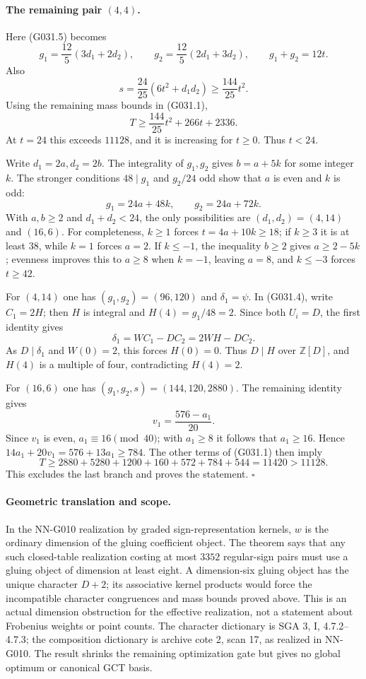 \paragraph{The remaining pair $(4,4)$.}
Here (G031.5) becomes
\[
 g_1=\frac{12}{5}(3d_1+2d_2),\qquad
 g_2=\frac{12}{5}(2d_1+3d_2),\qquad
 g_1+g_2=12t.
\]
Also
\[
 s=\frac{24}{25}(6t^2+d_1d_2)\ge\frac{144}{25}t^2.
\]
Using the remaining mass bounds in (G031.1),
\[
 T\ge\frac{144}{25}t^2+266t+2336.                  \tag{G031.6}
\]
At $t=24$ this exceeds $11128$, and it is increasing
for $t\ge0$. Thus $t<24$.

Write $d_1=2a,d_2=2b$. The integrality of $g_1,g_2$
gives $b=a+5k$ for some integer $k$. The stronger
conditions $48\mid g_1$ and $g_2/24$ odd show
that $a$ is even and $k$ is odd:
\[
 g_1=24a+48k,\qquad g_2=24a+72k.
\]
With $a,b\ge2$ and $d_1+d_2<24$, the only possibilities
are $(d_1,d_2)=(4,14)$ and $(16,6)$.
For completeness, $k\ge1$ forces $t=4a+10k\ge18$;
if $k\ge3$ it is at least $38$, while $k=1$ forces
$a=2$. If $k\le-1$, the inequality $b\ge2$ gives
$a\ge2-5k$; evenness improves this to $a\ge8$ when
$k=-1$, leaving $a=8$, and $k\le-3$ forces $t\ge42$.

For $(4,14)$ one has $(g_1,g_2)=(96,120)$ and
$\delta_1=\psi$. In (G031.4), write $C_1=2H$;
then $H$ is integral and $H(4)=g_1/48=2$.
Since both $U_i=D$, the first identity gives
\[
 \delta_1=W C_1-D C_2=2W H-D C_2.
\]
As $D\mid\delta_1$ and $W(0)=2$, this forces
$H(0)=0$. Thus $D\mid H$ over $\mathbb Z[D]$, and
$H(4)$ is a multiple of four, contradicting $H(4)=2$.

For $(16,6)$ one has $(g_1,g_2,s)=(144,120,2880)$.
The remaining identity gives
\[
 v_1=\frac{576-a_1}{20}.
\]
Since $v_1$ is even, $a_1\equiv16\pmod{40}$;
with $a_1\ge8$ it follows that $a_1\ge16$.
Hence $14a_1+20v_1=576+13a_1\ge784$.
The other terms of (G031.1) then imply
\[
 T\ge2880+5280+1200+160+572+784+544
       =11420>11128.
\]
This excludes the last branch and proves the statement.
\hfill$\square$

\paragraph{Geometric translation and scope.}
In the NN-G010 realization by graded sign-representation
kernels, $w$ is the ordinary dimension of the gluing
coefficient object. The theorem says that any such
closed-table realization costing at most $3352$
regular-sign pairs must use a gluing object of dimension
at least eight. A dimension-six gluing object has the
unique character $D+2$; its associative kernel products
would force the incompatible character congruences and
mass bounds proved above. This is an actual dimension
obstruction for the effective realization, not a statement
about Frobenius weights or point counts. The character
dictionary is SGA 3, I, 4.7.2--4.7.3; the composition
dictionary is archive cote 2, scan 17, as realized in
NN-G010. The result shrinks the remaining optimization
gate but gives no global optimum or canonical GCT basis.




